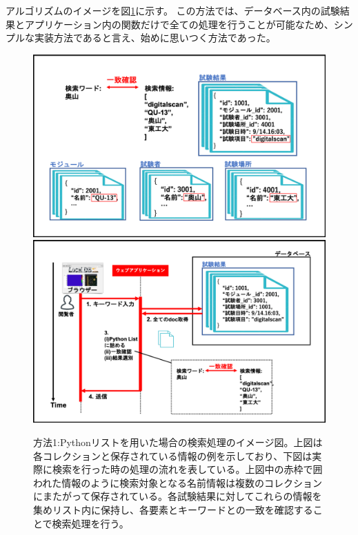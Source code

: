 アルゴリズムのイメージを図\ref{search_python_list}に示す。
この方法では、データベース内の試験結果とアプリケーション内の関数だけで全ての処理を行うことが可能なため、シンプルな実装方法であると言え、始めに思いつく方法であった。

\begin{figure}[bpt]
  \begin{center}
    \includegraphics[width=12cm]{./search_python_list.png}
    \includegraphics[width=12cm]{./search_python_list_flow.png}
  \caption[方法1:Pythonリストを用いた場合]
{方法1:Pythonリストを用いた場合の検索処理のイメージ図。上図は各コレクションと保存されている情報の例を示しており、下図は実際に検索を行った時の処理の流れを表している。上図中の赤枠で囲われた情報のように検索対象となる名前情報は複数のコレクションにまたがって保存されている。各試験結果に対してこれらの情報を集めリスト内に保持し、各要素とキーワードとの一致を確認することで検索処理を行う。}
  \label{search_python_list}
  \end{center}
\end{figure}


